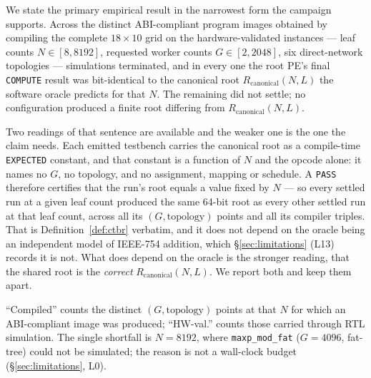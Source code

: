 \documentclass[journal,10pt]{IEEEtran}
\theoremstyle{plain}
\theoremstyle{definition}
\theoremstyle{remark}
\newcommand{\Rcan}{\ensuremath{R_{\mathrm{canonical}}}}
\newcommand{\sprs}{\textsc{SPRS}}
\newcommand{\sv}[1]{\texttt{#1}}
\begin{document}
We state the primary empirical result in the narrowest form the campaign
supports. Across the \InvAttempted{} distinct ABI-compliant program images
obtained by compiling the complete $18\times10$ grid on the \TournNInst{}
hardware-validated instances --- \InvLeafCounts{} leaf counts
$N \in [8,8192]$, requested worker counts $G \in [2,2048]$, six
direct-network topologies --- \WallTBs{} simulations terminated, and in every
one the root PE's final \texttt{COMPUTE} result was bit-identical to the
canonical root $\Rcan(N,L)$ the software oracle predicts for that $N$. The
remaining \InvNonSettling{} did not settle; no configuration produced a finite
root differing from $\Rcan(N,L)$.

Two readings of that sentence are available and the weaker one is the one the
claim needs. Each emitted testbench carries the canonical root as a
compile-time \sv{EXPECTED} constant, and that constant is a function of $N$ and
the opcode alone: it names no $G$, no topology, and no assignment, mapping or
schedule. A \sv{PASS} therefore certifies that the run's root equals a value
fixed by $N$ --- so every settled run at a given leaf count produced the same
64-bit root as every other settled run at that leaf count, across all its
$(G,\text{topology})$ points and all its compiler triples. That is
Definition~\ref{def:ctbr} verbatim, and it does not depend on the oracle being
an independent model of IEEE-754 addition, which \S\ref{sec:limitations} (L13)
records it is not. What does depend on the oracle is the stronger reading, that
the shared root is the \emph{correct} $\Rcan(N,L)$. We report both and keep
them apart.

\begin{table}[!t]
\caption{Cross-topology bitwise invariance. Each row aggregates all
  HW-validated \sprs{} configurations at the given $N$ over all same-$N$
  $(G,\text{topology})$ pairs and all compiler triples. ``Divergent'' is by
  Claim~\ref{claim:1} expected to be zero. The two mutation columns count
  injected mutants the harness \emph{flagged}; as discussed below, a flag is a
  value mismatch for leaf corruption but usually a fail-stop for address
  substitution, and only the former bears on oracle non-vacuity.}
\label{tab:invariance}
\centering
\footnotesize
\renewcommand{\arraystretch}{1.15}

\vspace{2pt}

\footnotesize
``Compiled'' counts the distinct $(G,\text{topology})$ points at that $N$ for
which an ABI-compliant image was produced; ``HW-val.'' counts those carried
through RTL simulation. The single shortfall is $N{=}8192$, where
\sv{maxp\_mod\_fat} ($G{=}4096$, fat-tree) could not be simulated; the reason
is not a wall-clock budget (\S\ref{sec:limitations}, L0).
\end{table}
\end{document}
